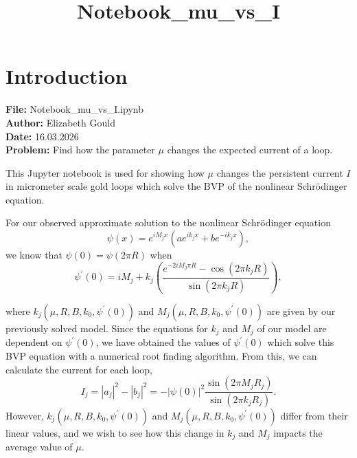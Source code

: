 \documentclass[11pt]{article}
\title{Notebook\_mu\_vs\_I}
\begin{document}
    
    \maketitle
    
    

    
    \hypertarget{introduction}{%
\section{Introduction}\label{introduction}}

    \textbf{File:} Notebook\_mu\_vs\_I.ipynb\\
\textbf{Author:} Elizabeth Gould\\
\textbf{Date:} 16.03.2026\\
\textbf{Problem:} Find how the parameter \(\mu\) changes the expected
current of a loop.

    This Jupyter notebook is used for showing how \(\mu\) changes the
persistent current \(I\) in micrometer scale gold loops which solve the
BVP of the nonlinear Schrödinger equation.

For our observed approximate solution to the nonlinear Schrödinger
equation \begin{equation}
\psi(x) = e^{i M_{j} x} \left( a e^{i k_{j} x} + b e^{- i k_{j} x} \right),
\end{equation} we know that \(\psi(0) = \psi(2\pi R)\) when
\begin{equation}
\psi^\prime(0) = i M_{j} + k_j \left( \frac{e^{- 2 i M_{j}\pi R} - \cos\left( 2\pi k_{j} R \right)}{\sin\left(2\pi k_{j} R\right)}\right),
\end{equation}

where \(k_{j}\left(\mu, R, B, k_0, \psi^\prime(0) \right)\) and
\(M_{j}\left(\mu, R, B, k_0, \psi^\prime(0) \right)\) are given by our
previously solved model. Since the equations for \(k_j\) and \(M_j\) of
our model are dependent on \(\psi^\prime(0)\), we have obtained the
values of \(\psi^\prime(0)\) which solve this BVP equation with a
numerical root finding algorithm. From this, we can calculate the
current for each loop, \begin{equation}
I_j =\left|a_j\right|^2 - \left|b_j\right|^2 = - \left| \psi(0) \right|^2 \frac{\sin\left(2 \pi M_j R_j\right)}{\sin\left(2 \pi k_j R_j\right)}.
\end{equation} However,
\(k_{j}\left(\mu, R, B, k_0, \psi^\prime(0) \right)\) and
\(M_{j}\left(\mu, R, B, k_0, \psi^\prime(0) \right)\) differ from their
linear values, and we wish to see how this change in \(k_j\) and \(M_j\)
impacts the average value of \(\mu\).
\end{document}
